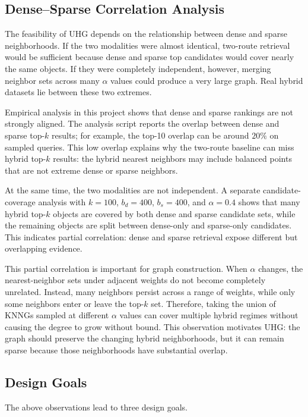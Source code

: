 \subsection{Dense--Sparse Correlation Analysis}

The feasibility of UHG depends on the relationship between dense and sparse neighborhoods. If the two modalities were almost identical, two-route retrieval would be sufficient because dense and sparse top candidates would cover nearly the same objects. If they were completely independent, however, merging neighbor sets across many $\alpha$ values could produce a very large graph. Real hybrid datasets lie between these two extremes.

Empirical analysis in this project shows that dense and sparse rankings are not strongly aligned. The analysis script reports the overlap between dense and sparse top-$k$ results; for example, the top-10 overlap can be around $20\%$ on sampled queries. This low overlap explains why the two-route baseline can miss hybrid top-$k$ results: the hybrid nearest neighbors may include balanced points that are not extreme dense or sparse neighbors.

At the same time, the two modalities are not independent. A separate candidate-coverage analysis with $k=100$, $b_d=400$, $b_s=400$, and $\alpha=0.4$ shows that many hybrid top-$k$ objects are covered by both dense and sparse candidate sets, while the remaining objects are split between dense-only and sparse-only candidates. This indicates partial correlation: dense and sparse retrieval expose different but overlapping evidence.

This partial correlation is important for graph construction. When $\alpha$ changes, the nearest-neighbor sets under adjacent weights do not become completely unrelated. Instead, many neighbors persist across a range of weights, while only some neighbors enter or leave the top-$k$ set. Therefore, taking the union of KNNGs sampled at different $\alpha$ values can cover multiple hybrid regimes without causing the degree to grow without bound. This observation motivates UHG: the graph should preserve the changing hybrid neighborhoods, but it can remain sparse because those neighborhoods have substantial overlap.

\subsection{Design Goals}

The above observations lead to three design goals.

